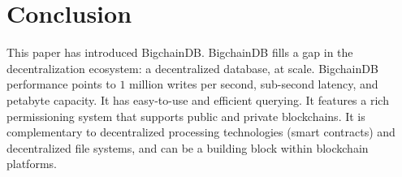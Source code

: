 \section{Conclusion}\label{sec:conclusion}

This paper has introduced BigchainDB. BigchainDB fills a gap in the decentralization ecosystem: a decentralized database, at scale.
BigchainDB performance points to $1$ million writes per second, sub-second latency, and petabyte capacity.
It has easy-to-use and efficient querying.
It features a rich permissioning system that supports public and private blockchains.
It is complementary to decentralized processing technologies (smart contracts) and decentralized file systems, and can be a building block within blockchain platforms.

